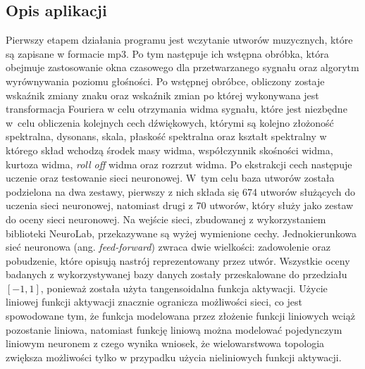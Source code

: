 \subsection{Opis aplikacji}
Pierwszy etapem działania programu jest wczytanie utworów muzycznych, które są zapisane w formacie mp3. Po tym następuje ich wstępna obróbka, która obejmuje zastosowanie okna czasowego dla przetwarzanego sygnału oraz algorytm wyrównywania poziomu głośności. Po wstępnej obróbce, obliczony zostaje wskaźnik zmiany znaku oraz wskaźnik zmian po której wykonywana jest transformacja Fouriera w celu otrzymania widma sygnału, które jest niezbędne w~celu obliczenia kolejnych cech dźwiękowych, którymi są kolejno złożoność spektralna, dysonans, skala, płaskość spektralna oraz kształt spektralny w którego skład wchodzą środek masy widma, współczynnik skośności widma, kurtoza widma, \emph{roll off} widma oraz rozrzut widma. Po ekstrakcji cech następuje uczenie oraz testowanie sieci neuronowej. W~tym celu baza utworów została podzielona na dwa zestawy, pierwszy z nich składa się 674 utworów służących do uczenia sieci neuronowej, natomiast drugi z 70 utworów, który służy jako zestaw do oceny sieci neuronowej. Na wejście sieci, zbudowanej z wykorzystaniem biblioteki NeuroLab, przekazywane są wyżej wymienione cechy. Jednokierunkowa sieć neuronowa (ang. \emph{feed-forward}) zwraca dwie wielkości: zadowolenie oraz pobudzenie, które opisują nastrój reprezentowany przez utwór. Wszystkie oceny badanych z wykorzystywanej bazy danych zostały przeskalowane do przedziału $[-1,1]$, ponieważ została użyta tangensoidalna funkcja aktywacji. Użycie liniowej funkcji aktywacji znacznie ogranicza możliwości sieci, co jest spowodowane tym, że funkcja modelowana przez złożenie funkcji liniowych wciąż pozostanie liniowa, natomiast funkcję liniową można modelować pojedynczym liniowym neuronem z czego wynika wniosek, że wielowarstwowa topologia zwiększa możliwości tylko w przypadku użycia nieliniowych funkcji aktywacji.

